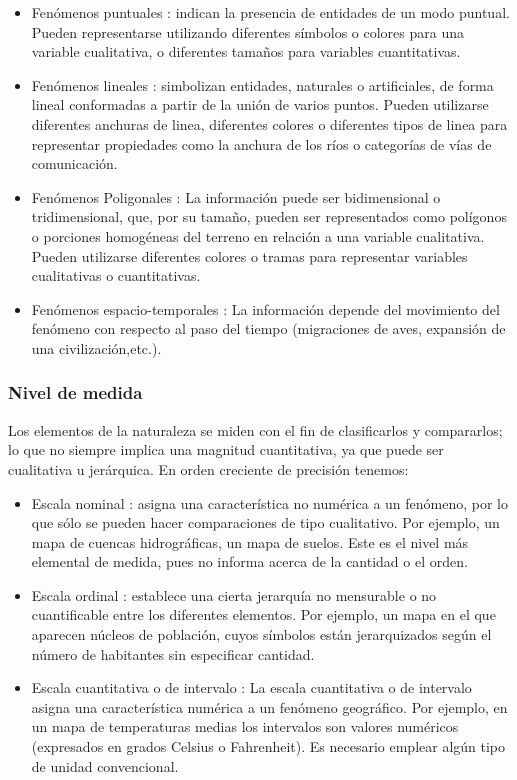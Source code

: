 \begin{itemize}
    \item Fenómenos puntuales : indican la presencia de entidades de un modo puntual. Pueden representarse utilizando 
    diferentes símbolos o colores para una variable cualitativa, o diferentes tamaños para variables cuantitativas.
    
    \item Fenómenos lineales : simbolizan entidades, naturales o artificiales, de forma lineal conformadas a partir de
    la unión de varios puntos. Pueden utilizarse diferentes anchuras de linea, diferentes colores o diferentes tipos de
    linea para representar propiedades como la anchura de los ríos o categorías de vías de comunicación.
    
    \item Fenómenos Poligonales : La información puede ser bidimensional o tridimensional, que, por su tamaño, pueden 
    ser representados como polígonos o porciones homogéneas del terreno en relación a una variable cualitativa. 
    Pueden utilizarse diferentes colores o tramas para representar variables cualitativas o cuantitativas.

    \item Fenómenos espacio-temporales : La información depende del movimiento del fenómeno con respecto al paso del
    tiempo (migraciones de aves, expansión de una civilización,etc.).
\end{itemize}

\subsubsection{Nivel de medida}
Los elementos de la naturaleza se miden con el fin de clasificarlos y compararlos; lo que no siempre implica una
magnitud cuantitativa, ya que puede ser cualitativa u jerárquica. En orden creciente de precisión tenemos:
\begin{itemize}
    \item Escala nominal : asigna una característica no numérica a un fenómeno, por lo que sólo se pueden hacer 
    comparaciones de tipo cualitativo. Por ejemplo, un mapa de cuencas hidrográficas, un mapa de suelos. 
    Este es el nivel más elemental de medida, pues no informa acerca de la cantidad o el orden.
    
    \item Escala ordinal : establece una cierta jerarquía no mensurable o no cuantificable entre los diferentes
    elementos. Por ejemplo, un mapa en el que aparecen núcleos de población, cuyos símbolos están jerarquizados
    según el número de habitantes sin especificar cantidad.
    
    \item Escala cuantitativa o de intervalo : La escala cuantitativa o de intervalo asigna una característica 
    numérica a un fenómeno geográfico. Por ejemplo, en un mapa de temperaturas medias los intervalos son valores 
    numéricos (expresados en grados Celsius o Fahrenheit). Es necesario emplear algún tipo de unidad convencional.
\end{itemize}

